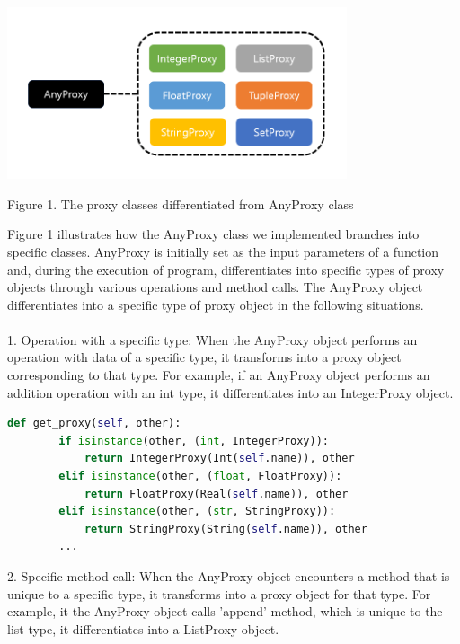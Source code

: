 \documentclass[11pt]{article}
\begin{document}
\begin{center}
\includegraphics[width = 10cm]{Anyproxy_to_proxies.PNG}

{Figure 1. The proxy classes differentiated from AnyProxy class}
\end{center}

\pagebreak

Figure 1 illustrates how the AnyProxy class we implemented branches into specific classes. AnyProxy is initially set as the input parameters of a function and, during the execution of program, differentiates into specific types of proxy objects through various operations and method calls. The AnyProxy object differentiates into a specific type of proxy object in the following situations. \\ \\
1. Operation with a specific type: When the AnyProxy object performs an operation with data of a specific type, it transforms into a proxy object corresponding to that type. For example, if an AnyProxy object performs an addition operation with an int type, it differentiates into an IntegerProxy object. \\

\begin{lstlisting}[language=python]
def get_proxy(self, other):
        if isinstance(other, (int, IntegerProxy)):
            return IntegerProxy(Int(self.name)), other
        elif isinstance(other, (float, FloatProxy)):
            return FloatProxy(Real(self.name)), other
        elif isinstance(other, (str, StringProxy)):
            return StringProxy(String(self.name)), other
        ...
\end{lstlisting}

2. Specific method call: When the AnyProxy object encounters a method that is unique to a specific type, it transforms into a proxy object for that type. For example, it the AnyProxy object calls 'append' method, which is unique to the list type, it differentiates into a ListProxy object. \\
\end{document}
